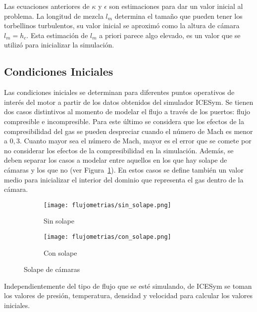 

Las ecuaciones anteriores de  $\kappa$ y $\epsilon$ son estimaciones para dar un
valor inicial al problema.
%
La longitud de mezcla $l_m$ determina el tamaño que pueden tener los torbellinos
turbulentos, su valor inicial se aproximó como la altura de cámara $l_m = h_c$.
%
Esta estimación de $l_{m}$ a priori parece algo elevado, es un valor que se
utilizó para inicializar la simulación.


\subsection{Condiciones Iniciales}\label{cap2:cond_iniciales}
%
Las condiciones iniciales se determinan para diferentes puntos operativos de
interés del motor a partir de los datos obtenidos del simulador ICESym.
%
Se tienen dos casos distintivos al momento de modelar el flujo a través de los
puertos: flujo compresible e incompresible.
%
Para este último se considera que los efectos de la compresibilidad del gas se
pueden despreciar cuando el número de Mach es menor a $0,3$.
%
Cuanto mayor sea el número de Mach, mayor es el error que se comete por no
considerar los efectos de la compresibilidad en la simulación.
%
Además, se deben separar los casos a modelar entre aquellos en los que hay
solape de cámaras y los que no (ver Figura~\ref{fig:solape}).
%
En estos casos se define también un valor medio para inicializar el interior
del dominio que representa el gas dentro de la cámara.

\begin{figure}[t!]
  \centering
    \begin{subfigure}[t]{0.4\textwidth}
        \centering
        \texttt{[image: flujometrias/sin\_solape.png]}
        \caption{Sin solape}
    \end{subfigure}%
    \begin{subfigure}[t]{0.4\textwidth}
        \centering
        \texttt{[image: flujometrias/con\_solape.png]}
        \caption{Con solape}
    \end{subfigure}
  \caption{Solape de cámaras}\label{fig:solape}
\end{figure}

Independientemente del tipo de flujo que se esté simulando, de ICESym se toman
los valores de presión, temperatura, densidad y velocidad para calcular los
valores iniciales.


